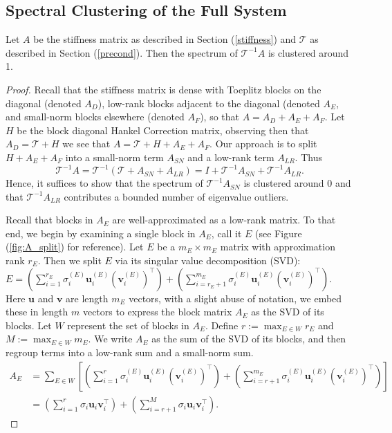 \documentclass[review]{siamart251216}
\renewcommand{\vec}[1]{{{\mathbf{#1}}}}
\renewcommand{\u}{{\vec  u }}
\renewcommand{\v}{{\vec  v }}
\newcommand{\A}{{A }}
\newcommand{\offd}{{A_E}}
\newcommand{\off}{{E}}
\newcommand{\setoff}{{W}}
\newcommand{\Hank}{{ H }}
\newcommand{\Tau}{\mathcal{T}}
\begin{document}
\subsection{Spectral Clustering of the Full System} \label{proof}
\begin{theorem}
	Let $\A$ be the stiffness matrix as described in Section (\ref{stiffness}) and $\Tau$ as described in Section (\ref{precond}). Then the spectrum of $\Tau^{-1} \A$ is clustered around 1. 
\end{theorem}

\begin{proof}

Recall that the stiffness matrix is dense with Toeplitz blocks on the diagonal (denoted $\A_D$), low-rank blocks adjacent to the diagonal (denoted $\offd$, and small-norm blocks elsewhere (denoted $\A_F$), so that $\A = \A_D + \offd + \A_F$. Let $\Hank$ be the block diagonal Hankel Correction matrix, observing then that $ \A_D = \Tau + \Hank$ we see that $\A = \Tau + \Hank + \offd + \A_F$. Our approach is to split $\Hank + \offd + \A_F$ into a small-norm term $A_{SN}$ and a low-rank term $\A_{LR}$. Thus 
\begin{equation}
		\Tau^{-1} \A = \Tau^{-1}(\Tau + \A_{SN} + \A_{LR} ) = I + \Tau^{-1}\A_{SN}  + \Tau^{-1}\A_{LR}.
\end{equation}
Hence, it suffices to show that the spectrum of $\Tau^{-1}\A_{SN}$ is clustered around 0 and that $\Tau^{-1}\A_{LR}$ contributes a bounded number of eigenvalue outliers. 

Recall that blocks in $\offd$ are well-approximated as a low-rank matrix. To that end, we begin by examining a single block in $\offd$, call it $\off$ (see Figure (\ref{fig:A_split}) for reference). Let $\off$ be a $m_{\off} \times m_{\off}$ matrix with approximation rank $r_{\off}$. Then we split $\off$ via its singular value decomposition (SVD):  
$ \off = \left( \sum_{i=1}^{r_{\off}} \sigma_i^{(\off)} \u_i ^{(\off)}(\v_i^{(\off)})^{\top} \right) + \left(  \sum_{i=r_{\off}+1}^{m_{\off}} \sigma_i^{(\off)} \u_i^{(\off)} (\v_i^{(\off)})^{\top} \right). $
Here $\u$ and $\v$ are length $m_{\off}$ vectors, with a slight abuse of notation, we embed these in length $m$ vectors to express the block matrix $\offd$ as the SVD of its blocks. Let $\setoff$ represent the set of blocks in $\offd$. Define $r := \max_{\off \in \setoff} r_{\off}$ and $M := \max_{\off \in \setoff} m_{\off}$. We write $\offd$ as the sum of the SVD of its blocks, and then regroup terms into a low-rank sum and a small-norm sum. 
\begin{align*}
	\offd &= \sum_{\off \in \setoff} \left[ \left( \sum_{i=1}^{r} \sigma_i^{(\off)} \u_i ^{(\off)} (\v_i^{(\off)})^{\top} \right) + \left(  \sum_{i=r+1}^{m_{\off}} \sigma_i^{(\off)} \u_i^{(\off)} (\v_i^{(\off)})^{\top}  \right) \right]  \\
	&= \left( \sum_{i=1}^{r} \sigma_i \u_i \v_i^{\top} \right) + \left(  \sum_{i=r+1}^{M} \sigma_i \u_i \v_i^{\top}  \right) .
\end{align*}


\end{proof}
\end{document}
